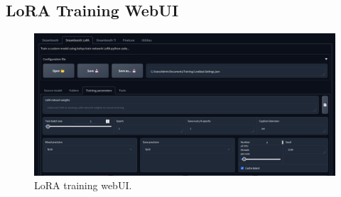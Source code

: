 \documentclass[preprint]{elsarticle}
\begin{document}
\subsection{LoRA Training WebUI} \label{sec:lora_training_webui}

\begin{figure}[H]
	\centering
	\includegraphics[width=15cm, keepaspectratio]{img/project_img/lora.png} 
	\caption{LoRA training webUI.}
	\label{fig:lora-webui}
\end{figure}
\end{document}
